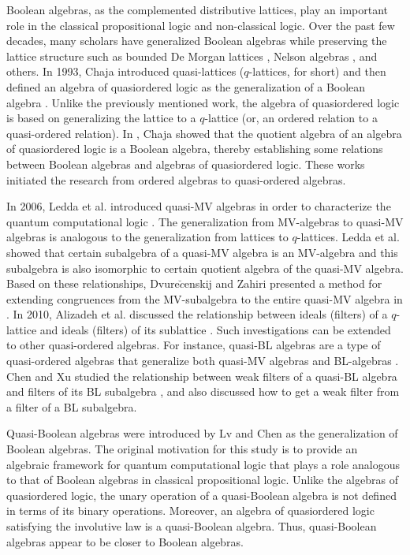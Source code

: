 \documentclass[12pt]{amsart}
\theoremstyle{definition}
\theoremstyle{remark}
\numberwithin{equation}{section}
\begin{document}
Boolean algebras, as the complemented distributive lattices, play an important role in the classical propositional logic and non-classical logic. Over the past few decades, many scholars have generalized Boolean algebras while preserving the lattice structure such as bounded De Morgan lattices \cite{DeM}, Nelson algebras \cite{Nelsonalgebras}, and others.
In 1993, Chaja introduced quasi-lattices ($q$-lattices, for short) \cite{q-lattice} and then defined an algebra of quasiordered logic as the generalization of a Boolean algebra \cite{quasiordered}.
Unlike the previously mentioned work, the algebra of quasiordered logic is based on generalizing the lattice to a $q$-lattice (or, an ordered relation to a quasi-ordered relation). In \cite{quasiordered}, Chaja showed that the quotient algebra of an algebra of quasiordered logic is a Boolean algebra, thereby establishing some relations between Boolean algebras and algebras of quasiordered logic. These works initiated the research from ordered algebras to quasi-ordered algebras.

In 2006, Ledda et al. introduced quasi-MV algebras in order to characterize the quantum computational logic \cite{qMVstandard}. The generalization from MV-algebras to quasi-MV algebras is analogous to the generalization from lattices to $q$-lattices. Ledda et al. showed that certain subalgebra of a quasi-MV algebra is an MV-algebra and this subalgebra is also isomorphic to certain quotient algebra of the quasi-MV algebra. Based on these relationships, Dvure$\breve{c}$enskij and Zahiri presented a  method for extending congruences from the MV-subalgebra to the entire quasi-MV algebra in \cite{congruenceadd}.
In 2010, Alizadeh et al. discussed the relationship between ideals (filters) of a $q$-lattice and ideals (filters) of its sublattice \cite{a11}. Such investigations can be extended to other quasi-ordered algebras. For instance, quasi-BL algebras are a type of quasi-ordered algebras that generalize both quasi-MV algebras and BL-algebras \cite{chen20}.
Chen and Xu studied the relationship between weak filters of a quasi-BL algebra and filters of its BL subalgebra \cite{chen23}, and also discussed how to get a weak filter from a filter of a BL subalgebra.

Quasi-Boolean algebras were introduced by Lv and Chen \cite{Engineering, QB} as the generalization of Boolean algebras. The original motivation for this study is to provide an algebraic framework for quantum computational logic that plays a role analogous to that of Boolean algebras in classical propositional logic.
Unlike the algebras of quasiordered logic, the unary operation of a quasi-Boolean algebra is not defined in terms of its binary operations.
Moreover, an algebra of quasiordered logic satisfying the involutive law is a quasi-Boolean algebra. Thus, quasi-Boolean algebras appear to be closer to Boolean algebras.
\end{document}
